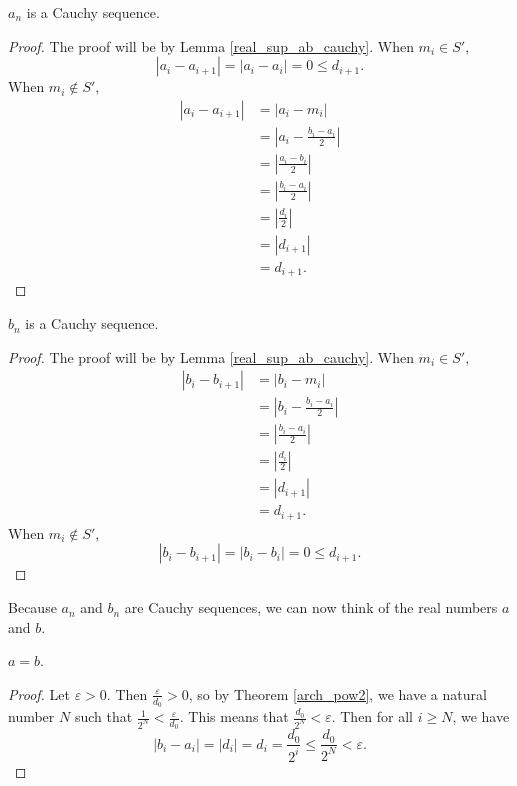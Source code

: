 \documentclass[../../math.tex]{subfiles}
\begin{document}
\begin{lemma} \label{real_sup_a_cauchy}
    $a_n$ is a Cauchy sequence.
\end{lemma}
\begin{proof}
    The proof will be by Lemma \ref{real_sup_ab_cauchy}.  When $m_i \in S'$,
    \[
        |a_i - a_{i+1}| = |a_i - a_i| = 0 \leq d_{i+1}.
    \]
    When $m_i \notin S'$,
    \begin{align*}
        |a_i - a_{i+1}|
        &= |a_i - m_i| \\
        &= \left|a_i - \frac{b_i - a_i}{2}\right| \\
        &= \left|\frac{a_i - b_i}{2}\right| \\
        &= \left|\frac{b_i - a_i}{2}\right| \\
        &= \left|\frac{d_i}{2}\right| \\
        &= |d_{i+1}| \\
        &= d_{i+1}.
    \end{align*}
\end{proof}

\begin{lemma} \label{real_sup_b_cauchy}
    $b_n$ is a Cauchy sequence.
\end{lemma}
\begin{proof}
    The proof will be by Lemma \ref{real_sup_ab_cauchy}.  When $m_i \in S'$,
    \begin{align*}
        |b_i - b_{i+1}|
        &= |b_i - m_i| \\
        &= \left|b_i - \frac{b_i - a_i}{2}\right| \\
        &= \left|\frac{b_i - a_i}{2}\right| \\
        &= \left|\frac{d_i}{2}\right| \\
        &= |d_{i+1}| \\
        &= d_{i+1}.
    \end{align*}
    When $m_i \notin S'$,
    \[
        |b_i - b_{i+1}| = |b_i - b_i| = 0 \leq d_{i+1}.
    \]
\end{proof}

Because $a_n$ and $b_n$ are Cauchy sequences, we can now think of the real
numbers $a$ and $b$.

\begin{lemma}
    $a = b$.
\end{lemma}
\begin{proof}
    Let $\varepsilon > 0$.  Then $\frac{\varepsilon}{d_0} > 0$, so by Theorem
    \ref{arch_pow2}, we have a natural number $N$ such that $\frac{1}{2^N} <
    \frac{\varepsilon}{d_0}$.  This means that $\frac{d_0}{2^N} <
    \varepsilon$.  Then for all $i \geq N$, we have
    \[
        |b_i - a_i| = |d_i| = d_i = \frac{d_0}{2^i} \leq \frac{d_0}{2^N} <
        \varepsilon.
    \]
\end{proof}
\end{document}
